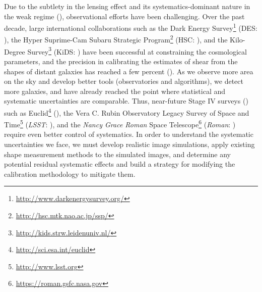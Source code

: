 \documentclass[fleqn,usenatbib]{mnras}
\begin{document}
Due to the subtlety in the lensing effect and its systematics-dominant nature in the weak regime (\citealt{2018ARA&A..56..393M}), observational efforts have been challenging. Over the past decade, large international collaborations such as the Dark Energy Survey\footnote{\url{http://www.darkenergysurvey.org/}} (DES: \citealt{2005astro.ph.10346T}), the Hyper Suprime-Cam Subaru Strategic Program\footnote{\url{http://hsc.mtk.nao.ac.jp/ssp/}} (HSC: \citealt{2018PASJ...70S...4A}), and the Kilo-Degree Survey\footnote{\url{http://kids.strw.leidenuniv.nl/}} (KiDS: \citealt{2013ExA....35...25D}) have been successful at constraining the cosmological parameters, and the precision in calibrating the estimates of shear from the shapes of distant galaxies has reached a few percent (\citealt{2018MNRAS.481.3170M, 2020arXiv201103408G, 2020arXiv201208567M, 2021A&A...645A.105G}). As we observe more area on the sky and develop better tools (observatories and algorithms), we detect more galaxies, and have already reached the point where statistical and systematic uncertainties are comparable. Thus, near-future Stage IV surveys (\citealt{2006astro.ph..9591A}) such as Euclid\footnote{\url{ http://sci.esa.int/euclid}} (\citealt{2011arXiv1110.3193L}), the Vera C. Rubin Observatory Legacy Survey of Space and Time\footnote{\url{ http://www.lsst.org}} (\emph{LSST}: \citealt{2009arXiv0912.0201L, 2019ApJ...873..111I}), and the \emph{Nancy Grace Roman} Space Telescope\footnote{\url{https://roman.gsfc.nasa.gov}} (\emph{Roman}: \citealt{2015arXiv150303757S}) require even better control of systematics. In order to understand the systematic uncertainties we face, we must develop realistic image simulations, apply existing shape measurement methods to the simulated images, and determine any potential residual systematic effects and build a strategy for modifying the calibration methodology to mitigate them.  
\end{document}

